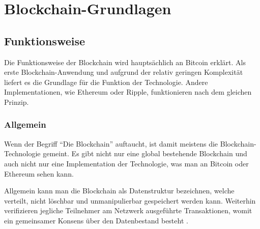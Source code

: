 \chapter{Blockchain-Grundlagen}
\label{cha:grundlagen}

\section{Funktionsweise}
Die Funktionsweise der Blockchain wird hauptsächlich an Bitcoin erklärt. Als erste Blockchain-Anwendung \cite{ZhengBlockchainChallengesOpportunities2017} und aufgrund der relativ geringen Komplexität liefert es die Grundlage für die Funktion der Technologie. Andere Implementationen, wie Ethereum oder Ripple, funktionieren nach dem gleichen Prinzip.

\subsection{Allgemein}
Wenn der Begriff ``Die Blockchain'' auftaucht, ist damit meistens die Blockchain-Technologie gemeint. Es gibt nicht nur eine global bestehende Blockchain und auch nicht nur eine Implementation der Technologie, was man an Bitcoin oder Ethereum sehen kann.

Allgemein kann man die Blockchain als Datenstruktur bezeichnen, welche verteilt, nicht löschbar und unmanipulierbar gespeichert werden kann. Weiterhin verifizieren jegliche Teilnehmer am Netzwerk ausgeführte Transaktionen, womit ein gemeinsamer Konsens über den Datenbestand besteht \cite{CrosbyBlockChainTechnologyBitcoin2016}.

